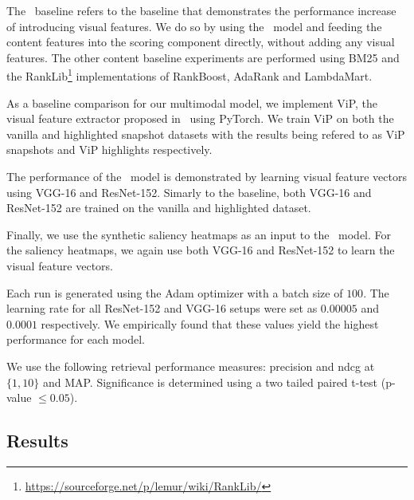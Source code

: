 The \modelname~baseline refers to the baseline that demonstrates the performance increase of introducing visual features. We do so by using the \modelname~model and feeding the content features into the scoring component directly, without adding any visual features. 
The other content baseline experiments are performed using BM25 and the RankLib\footnote{\url{https://sourceforge.net/p/lemur/wiki/RankLib/}} implementations of RankBoost, AdaRank and LambdaMart.

As a baseline comparison for our multimodal model, we implement ViP, the visual feature extractor proposed in~\citet{fan2017learning} using PyTorch. We train ViP on both the vanilla and highlighted snapshot datasets with the results being refered to as ViP snapshots and ViP highlights respectively.

The performance of the \modelname~model is demonstrated by learning visual feature vectors using VGG-16 and ResNet-152. Simarly to the baseline, both VGG-16 and ResNet-152 are trained on the vanilla and highlighted dataset. 

Finally, we use the synthetic saliency heatmaps as an input to the \modelname~model. For the saliency heatmaps, we again use both VGG-16 and ResNet-152 to learn the visual feature vectors.

Each run is generated using the Adam optimizer with a batch size of $100$. The learning rate for all ResNet-152 and VGG-16 setups were set as $0.00005$ and $0.0001$ respectively. We empirically found that these values yield the highest performance for each model.

We use the following retrieval performance measures: precision and ndcg at $\{1,10\}$ and MAP.
Significance is determined using a two tailed paired t-test (p-value $\leq 0.05$). 


\subsection{Results}


